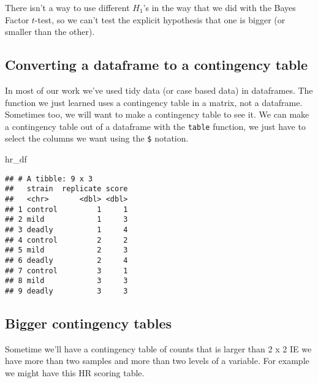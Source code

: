 \documentclass[
]{book}
\newenvironment{Shaded}{\begin{snugshade}}{\end{snugshade}}
\newcommand{\KeywordTok}[1]{\textcolor[rgb]{0.13,0.29,0.53}{\textbf{#1}}}
\newcommand{\NormalTok}[1]{#1}
\newcommand{\OperatorTok}[1]{\textcolor[rgb]{0.81,0.36,0.00}{\textbf{#1}}}
\newcommand{\StringTok}[1]{\textcolor[rgb]{0.31,0.60,0.02}{#1}}
\begin{document}
There isn't a way to use different \(H_1\)'s in the way that we did with the Bayes Factor \(t\)-test, so we can't test the explicit hypothesis that one is bigger (or smaller than the other).

\hypertarget{converting-a-dataframe-to-a-contingency-table}{%
\subsection{Converting a dataframe to a contingency table}\label{converting-a-dataframe-to-a-contingency-table}}

In most of our work we've used tidy data (or case based data) in dataframes. The function we just learned uses a contingency table in a matrix, not a dataframe. Sometimes too, we will want to make a contingency table to see it. We can make a contingency table out of a dataframe with the \texttt{table} function, we just have to select the columns we want using the \texttt{\$} notation.

\begin{Shaded}
\begin{Highlighting}[]
\NormalTok{hr_df}
\end{Highlighting}
\end{Shaded}

\begin{verbatim}
## # A tibble: 9 x 3
##   strain  replicate score
##   <chr>       <dbl> <dbl>
## 1 control         1     1
## 2 mild            1     3
## 3 deadly          1     4
## 4 control         2     2
## 5 mild            2     3
## 6 deadly          2     4
## 7 control         3     1
## 8 mild            3     3
## 9 deadly          3     3
\end{verbatim}

\begin{Shaded}
\end{Shaded}

\hypertarget{bigger-contingency-tables}{%
\subsection{Bigger contingency tables}\label{bigger-contingency-tables}}

Sometime we'll have a contingency table of counts that is larger than 2 x 2 IE we have more than two samples and more than two levels of a variable. For example we might have this HR scoring table.
\end{document}

